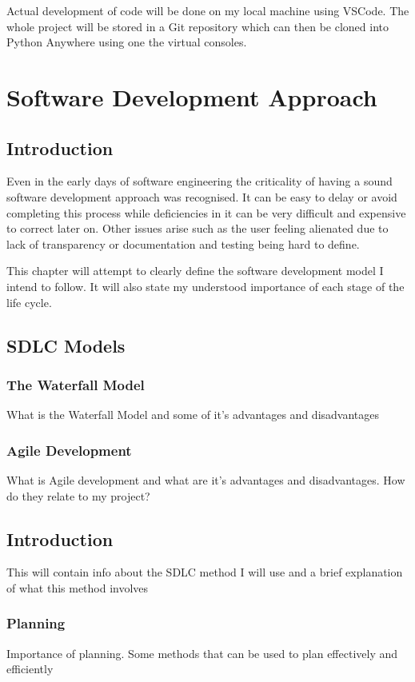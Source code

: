 \documentclass[10pt,a4paper]{article}
\begin{document}
Actual development of code will be done on my local machine using VSCode. The whole project will be stored in a Git repository which can then be cloned into Python Anywhere using one the virtual consoles. 

\section{Software Development Approach}
\subsection{Introduction}
Even in the early days of software engineering the criticality of having a sound software development approach was recognised. It can be easy to delay or avoid completing this process while deficiencies in it can be very difficult and expensive to correct later on. Other issues arise such as the user feeling alienated due to lack of transparency or documentation and testing being hard to define\citep{1674590}.

This chapter will attempt to clearly define the software development model I intend to follow. It will also state my understood importance of each stage of the life cycle. 
\subsection{SDLC Models}
\subsubsection{The Waterfall Model}
What is the Waterfall Model and some of it's advantages and disadvantages
\subsubsection{Agile Development}
What is Agile development and what are it's advantages and disadvantages. How do they relate to my project? 

\subsection{Introduction}
This will contain info about the SDLC method I will use and a brief explanation of what this method involves
\subsubsection{Planning}
Importance of planning. Some methods that can be used to plan effectively and efficiently
\end{document}
